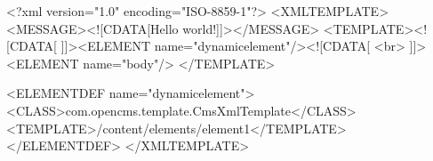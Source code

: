 <?xml version="1.0" encoding="ISO-8859-1"?>
<XMLTEMPLATE>
    <MESSAGE><![CDATA[Hello world!]]></MESSAGE>
    <TEMPLATE><![CDATA[
            ]]><ELEMENT name="dynamicelement"/><![CDATA[ <br>
        ]]><ELEMENT name="body"/>
    </TEMPLATE>

    <ELEMENTDEF name="dynamicelement">
        <CLASS>com.opencms.template.CmsXmlTemplate</CLASS>
        <TEMPLATE>/content/elements/element1</TEMPLATE>
    </ELEMENTDEF>
</XMLTEMPLATE>
